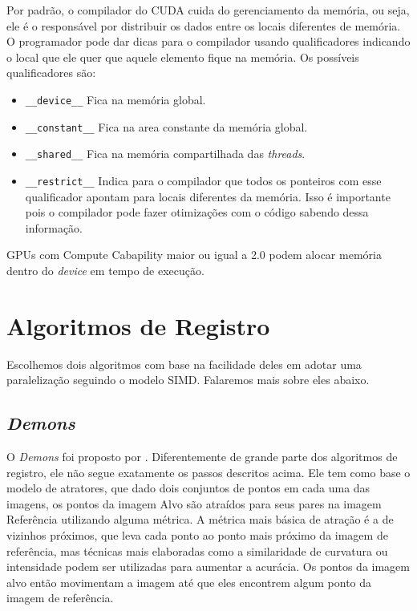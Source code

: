 Por padrão, o compilador do CUDA cuida do gerenciamento da memória, ou seja, ele é o responsável por distribuir os dados
entre os locais diferentes de memória. O programador pode dar dicas para o compilador usando qualificadores indicando o local
que ele quer que aquele elemento fique na memória. Os possíveis qualificadores são:
\begin{itemize}
  \item \verb#__device__# Fica na memória global.
  \item \verb#__constant__#   Fica na area constante da memória global.
  \item \verb#__shared__# Fica na memória compartilhada das \textit{threads}.
  \item \verb#__restrict__# Indica para o compilador que todos os ponteiros com esse qualificador apontam para locais diferentes
                            da memória. Isso é importante pois o compilador pode fazer otimizações com o código sabendo dessa informação.
\end{itemize}

GPUs com Compute Cabapility maior ou igual a 2.0 podem alocar memória dentro do \textit{device} em tempo de execução.

\section{Algoritmos de Registro}\label{sec:algReg}
    Escolhemos dois algoritmos com base na facilidade deles em adotar uma paralelização seguindo o modelo SIMD.
Falaremos mais sobre eles abaixo.

\subsection{\textit{Demons}}
    O \textit{Demons} foi proposto por \cite{thirion1995fast}. Diferentemente de grande parte dos algoritmos de registro,
ele não segue exatamente os passos descritos acima. Ele tem como base o modelo de atratores, que dado dois conjuntos de pontos
em cada uma das imagens, os pontos da imagem Alvo são atraídos para seus pares na imagem Referência utilizando alguma métrica.
A métrica mais básica de atração é a de vizinhos próximos, que leva cada ponto ao ponto mais próximo da imagem de
referência, mas técnicas mais elaboradas como a similaridade de curvatura ou intensidade podem ser utilizadas para
aumentar a acurácia. Os pontos da imagem alvo então movimentam a imagem até que eles encontrem algum ponto da imagem
de referência.

